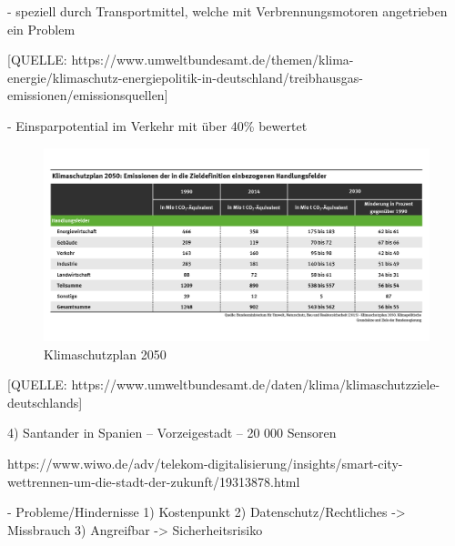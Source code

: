 -	speziell durch Transportmittel, welche mit Verbrennungsmotoren angetrieben ein Problem

[QUELLE: https://www.umweltbundesamt.de/themen/klima-energie/klimaschutz-energiepolitik-in-deutschland/treibhausgas-emissionen/emissionsquellen]

-	Einsparpotential im Verkehr mit über 40\% bewertet


\begin{figure}[ht]
	\includegraphics[width=\textwidth]{images/klimaschutzplan2050.png}
	\caption{Klimaschutzplan 2050}
	\label{fig2}
\end{figure}
[QUELLE: https://www.umweltbundesamt.de/daten/klima/klimaschutzziele-deutschlands]

4)	Santander in Spanien – Vorzeigestadt – 20 000 Sensoren

https://www.wiwo.de/adv/telekom-digitalisierung/insights/smart-city-wettrennen-um-die-stadt-der-zukunft/19313878.html



-	Probleme/Hindernisse
1)	Kostenpunkt
2)	Datenschutz/Rechtliches -> Missbrauch
3)	Angreifbar -> Sicherheitsrisiko



\clearpage
